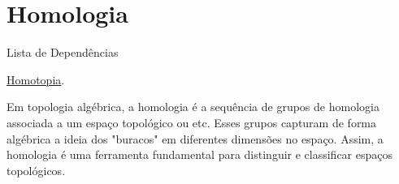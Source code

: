 \section{Homologia}
\label{homologia}

\begin{titlemize}{Lista de Dependências}
	\item \hyperref[homotopia]{Homotopia}.\\ %
\end{titlemize}

Em topologia algébrica, a homologia é a sequência de grupos de homologia associada a um espaço topológico ou etc. Esses grupos capturam de forma algébrica a ideia dos "buracos" em diferentes dimensões no espaço. Assim, a homologia é uma ferramenta fundamental para distinguir e classificar espaços topológicos.









